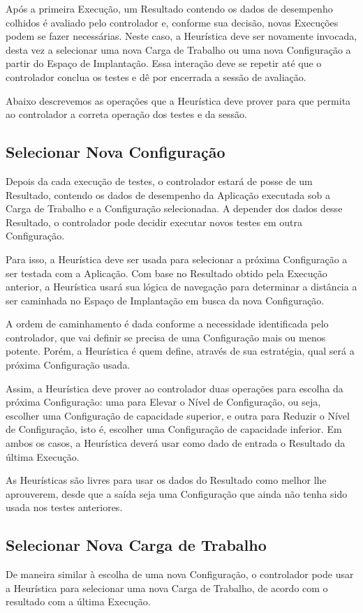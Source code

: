 Após a primeira Execução, um Resultado contendo os dados de desempenho colhidos 
é avaliado pelo controlador e, conforme sua decisão, novas Execuções podem se 
fazer necessárias. Neste caso, a Heurística deve ser novamente invocada, desta 
vez a selecionar uma nova Carga de Trabalho ou uma nova Configuração a partir do
Espaço de Implantação. Essa interação deve se repetir até que o controlador 
conclua os testes e dê por encerrada a sessão de avaliação.

Abaixo descrevemos as operações que a Heurística deve prover para que permita ao
controlador a correta operação dos testes e da sessão.

\subsection{Selecionar Nova Configuração}
Depois da cada execução de testes, o controlador estará de posse de um Resultado,
contendo os dados de desempenho da Aplicação executada sob a Carga de Trabalho e
a Configuração selecionadaa. A depender dos dados desse Resultado, o controlador
pode decidir executar novos testes em outra Configuração.

Para isso, a Heurística deve ser usada para selecionar a próxima Configuração a 
ser testada com a Aplicação. Com base no Resultado obtido pela Execução anterior,
a Heurística usará sua lógica de navegação para determinar a distância a ser 
caminhada no Espaço de Implantação em busca da nova Configuração.

A ordem de caminhamento é dada conforme a necessidade identificada pelo 
controlador, que vai definir se precisa de uma Configuração mais ou menos potente.
Porém, a Heurística é quem define, através de sua estratégia, qual será a próxima
Configuração usada.

Assim, a Heurística deve prover ao controlador duas operações para escolha da 
próxima Configuração: uma para Elevar o Nível de Configuração, ou seja, escolher
uma Configuração de capacidade superior, e outra para Reduzir o Nível de 
Configuração, isto é, escolher uma Configuração de capacidade inferior. Em ambos
os casos, a Heurística deverá usar como dado de entrada o Resultado da última 
Execução.

As Heurísticas são livres para usar os dados do Resultado como melhor lhe 
aprouverem, desde que a saída seja uma Configuração que ainda não tenha sido 
usada nos testes anteriores. 

\subsection{Selecionar Nova Carga de Trabalho}
De maneira similar à escolha de uma nova Configuração, o controlador pode usar
a Heurística para selecionar uma nova Carga de Trabalho, de acordo com o 
resultado com a última Execução.

